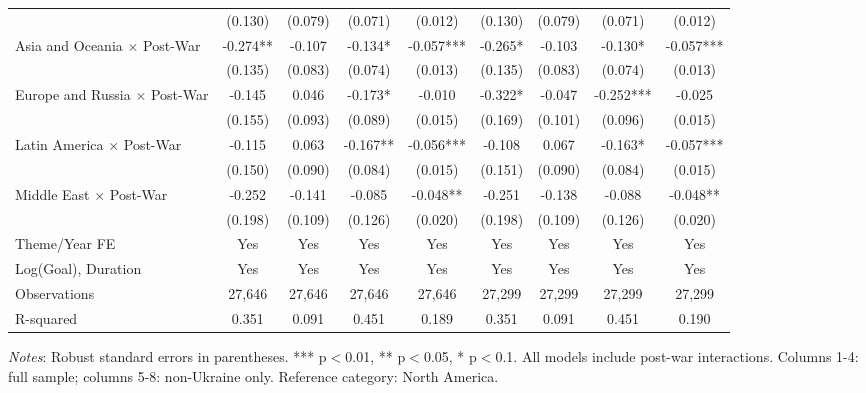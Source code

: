 \begin{table}[htbp]
\begin{threeparttable}
\begin{tabular}{lcccccccc}
 & (0.130) & (0.079) & (0.071) & (0.012) & (0.130) & (0.079) & (0.071) & (0.012) \\
Asia and Oceania $\times$ Post-War & -0.274** & -0.107 & -0.134* & -0.057*** & -0.265* & -0.103 & -0.130* & -0.057*** \\
 & (0.135) & (0.083) & (0.074) & (0.013) & (0.135) & (0.083) & (0.074) & (0.013) \\
Europe and Russia $\times$ Post-War & -0.145 & 0.046 & -0.173* & -0.010 & -0.322* & -0.047 & -0.252*** & -0.025 \\
 & (0.155) & (0.093) & (0.089) & (0.015) & (0.169) & (0.101) & (0.096) & (0.015) \\
Latin America $\times$ Post-War & -0.115 & 0.063 & -0.167** & -0.056*** & -0.108 & 0.067 & -0.163* & -0.057*** \\
 & (0.150) & (0.090) & (0.084) & (0.015) & (0.151) & (0.090) & (0.084) & (0.015) \\
Middle East $\times$ Post-War & -0.252 & -0.141 & -0.085 & -0.048** & -0.251 & -0.138 & -0.088 & -0.048** \\
 & (0.198) & (0.109) & (0.126) & (0.020) & (0.198) & (0.109) & (0.126) & (0.020) \\
\midrule
Theme/Year FE & Yes & Yes & Yes & Yes & Yes & Yes & Yes & Yes \\
Log(Goal), Duration & Yes & Yes & Yes & Yes & Yes & Yes & Yes & Yes \\
\midrule
Observations & 27,646 & 27,646 & 27,646 & 27,646 & 27,299 & 27,299 & 27,299 & 27,299 \\
R-squared & 0.351 & 0.091 & 0.451 & 0.189 & 0.351 & 0.091 & 0.451 & 0.190 \\
\bottomrule
\end{tabular}
\begin{tablenotes}
\small
\item \textit{Notes}: Robust standard errors in parentheses. *** p$<$0.01, ** p$<$0.05, * p$<$0.1. All models include post-war interactions. Columns 1-4: full sample; columns 5-8: non-Ukraine only. Reference category: North America.
\end{tablenotes}
\end{threeparttable}
\end{table}

